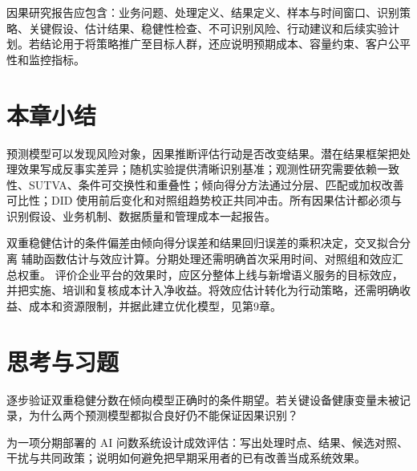 因果研究报告应包含：业务问题、处理定义、结果定义、样本与时间窗口、识别策略、关键假设、估计结果、稳健性检查、不可识别风险、行动建议和后续实验计划。若结论用于将策略推广至目标人群，还应说明预期成本、容量约束、客户公平性和监控指标。

\section*{本章小结}

预测模型可以发现风险对象，因果推断评估行动是否改变结果。潜在结果框架把处理效果写成反事实差异；随机实验提供清晰识别基准；观测性研究需要依赖一致性、SUTVA、条件可交换性和重叠性；倾向得分方法通过分层、匹配或加权改善可比性；DID 使用前后变化和对照组趋势校正共同冲击。所有因果估计都必须与识别假设、业务机制、数据质量和管理成本一起报告。

双重稳健估计的条件偏差由倾向得分误差和结果回归误差的乘积决定，交叉拟合分离
辅助函数估计与效应计算。分期处理还需明确首次采用时间、对照组和效应汇总权重。
评价企业平台的效果时，应区分整体上线与新增语义服务的目标效应，并把实施、培训和复核成本计入净收益。将效应估计转化为行动策略，还需明确收益、成本和资源限制，并据此建立优化模型，见第9章。


\section*{思考与习题}

\begin{exercise}[识别与稳健性]
逐步验证双重稳健分数在倾向模型正确时的条件期望。若关键设备健康变量未被记录，为什么两个预测模型都拟合良好仍不能保证因果识别？
\end{exercise}
\begin{exercise}[平台采用研究]
为一项分期部署的 AI 问数系统设计成效评估：写出处理时点、结果、候选对照、干扰与共同政策；说明如何避免把早期采用者的已有改善当成系统效果。
\end{exercise}

